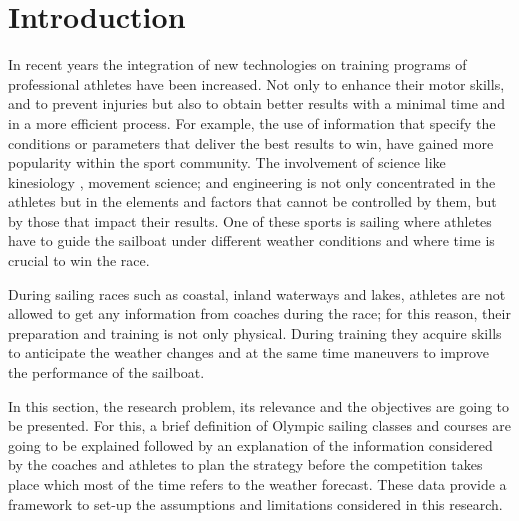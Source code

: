 \chapter{Introduction}


In recent years the integration of new technologies on training programs of professional athletes have been increased. Not only to enhance their motor skills, and to prevent injuries but also to obtain better results with a minimal time and in a more efficient process. For example, the use of information that specify the conditions or parameters that deliver the best results to win, have gained more popularity within the sport community. The involvement of science like kinesiology \cite{sjogaard2015science}, movement science; and engineering is not only concentrated in the athletes but in the elements and factors that cannot be controlled by them, but by those that impact their results. One of these sports is sailing where athletes have to guide the sailboat under different weather conditions and where time is crucial to win the race.\par
During sailing races such as coastal, inland waterways and lakes, athletes are not allowed to get any information from coaches during the race; for this reason, their preparation and training is not only physical. During training they acquire skills to anticipate the weather changes and at the same time maneuvers to improve the performance of the sailboat. \par
In this section, the research problem, its relevance and the objectives are going to be presented. For this, a brief definition of Olympic sailing classes and courses are going to be explained followed by an explanation of the information considered by the coaches and athletes to plan the strategy before the competition takes place which most of the time refers to the weather forecast. These data provide a framework to set-up the assumptions and limitations considered in this research. \par 
